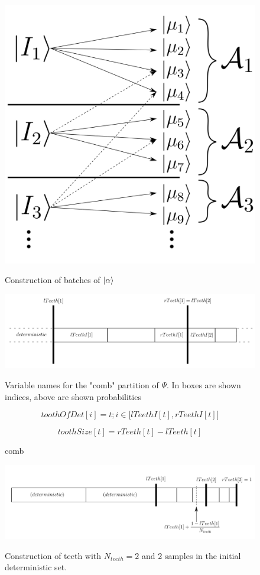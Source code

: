 \documentclass[./thesis.tex]{subfiles}
\begin{document}
\begin{figure}[h!]
	\begin{center}
		\includegraphics[width=0.5\columnwidth]{figures/pt2/mu_sample}
		\caption{}
		\label{fig:mu_sample}
		Construction of batches of $\ket \alpha$
	\end{center}
\end{figure}



\begin{figure}[h!]
	\label{comb_variables}
	\begin{center}
		\includegraphics[width=1.00\columnwidth]{figures/pt2/teeth}
		\caption{comb}
		Variable names for the "comb" partition of $\Psi$. In boxes are shown indices, above are shown probabilities
		
\begin{equation}
toothOfDet[i] = t ; i \in \big [ lTeethI[t],rTeethI[t] \big ]
\end{equation}

		
\begin{equation}
toothSize[t] = rTeeth[t] - lTeeth[t]
\end{equation}

	\end{center}
\end{figure}

\begin{figure}[h!]
	\begin{center}
		\includegraphics[width=1.00\columnwidth]{figures/pt2/teeths}
		\caption{\label{filtering}}
		Construction of teeth with $N_{teeth} = 2$ and 2 samples in the initial deterministic set.
	\end{center}
\end{figure}
\end{document}
